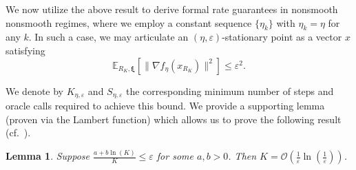 \documentclass[11pt,reqno]{amsart}
\newcommand{\1}{{\bf 1}}
\newcommand{\2}{{\bf 2}}
\newcommand{\mr}[1]{{\color{blue}#1}}
\newcommand{\bxi}{\boldsymbol{\xi}}
\newcommand{\bd}{\mathbf}
\numberwithin{equation}{section}
\newtheorem{lemma}{Lemma}[section]
\theoremstyle{remark}
\begin{document}
{	{We now utilize the above result to derive formal rate guarantees in nonsmooth nonsmooth regimes, where we employ a constant sequence $\{\eta_k\}$ with $\eta_k = \eta$ for any $k$}. In such a case, we may articulate an $(\eta,\varepsilon)$-stationary point as a vector $x$ satisfying 
	\begin{equation}
		\mathbb{E}_{R_K, \bxi}\left[\|\nabla f_{\eta}(x_{R_K})\|^2\right] \le \varepsilon^2.
	\end{equation}

		We denote by {$K_{\eta,\varepsilon}$ and $S_{\eta,\varepsilon}$} the corresponding minimum number of steps and {oracle calls} required to achieve this bound. We provide a supporting lemma (proven via the Lambert function) which allows us to prove the following result (cf.~\cite{jalilzdeh22smoothed}).\\
		
		\begin{lemma}\label{lambert} Suppose $\frac{a+b\ln(K)}{K} \le \varepsilon$ for some $a, b > 0$. Then $K = \mathcal{O}\left(\frac{1}{\varepsilon}\ln\left(\frac{1}{\varepsilon}\right)\right)$. 
		\end{lemma}
		
}
\end{document}
